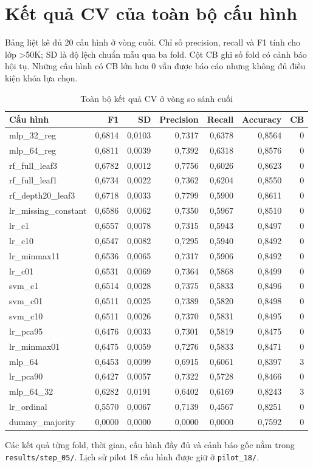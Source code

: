 \section{Kết quả CV của toàn bộ cấu hình}
\label{sec:C_1}
Bảng liệt kê đủ 20 cấu hình ở vòng cuối. Chỉ số precision, recall và F1 tính cho lớp >50K; SD là độ lệch chuẩn mẫu qua ba fold. Cột CB ghi số fold có cảnh báo hội tụ. Những cấu hình có CB lớn hơn 0 vẫn được báo cáo nhưng không đủ điều kiện khóa lựa chọn.
\begin{longtable}{lrrrrrr}
\caption{Toàn bộ kết quả CV ở vòng so sánh cuối}\label{tab:cv-all}\\
\toprule
Cấu hình & F1 & SD & Precision & Recall & Accuracy & CB \\
\midrule
mlp\_32\_reg & 0,6814 & 0,0103 & 0,7317 & 0,6378 & 0,8564 & 0 \\
mlp\_64\_reg & 0,6811 & 0,0039 & 0,7392 & 0,6318 & 0,8576 & 0 \\
rf\_full\_leaf3 & 0,6782 & 0,0012 & 0,7756 & 0,6026 & 0,8623 & 0 \\
rf\_full\_leaf1 & 0,6734 & 0,0022 & 0,7362 & 0,6204 & 0,8550 & 0 \\
rf\_depth20\_leaf3 & 0,6718 & 0,0033 & 0,7799 & 0,5900 & 0,8611 & 0 \\
lr\_missing\_constant & 0,6586 & 0,0062 & 0,7350 & 0,5967 & 0,8510 & 0 \\
lr\_c1 & 0,6557 & 0,0078 & 0,7315 & 0,5943 & 0,8497 & 0 \\
lr\_c10 & 0,6547 & 0,0082 & 0,7295 & 0,5940 & 0,8492 & 0 \\
lr\_minmax11 & 0,6536 & 0,0065 & 0,7317 & 0,5906 & 0,8492 & 0 \\
lr\_c01 & 0,6531 & 0,0069 & 0,7364 & 0,5868 & 0,8499 & 0 \\
svm\_c1 & 0,6514 & 0,0028 & 0,7375 & 0,5833 & 0,8496 & 0 \\
svm\_c01 & 0,6511 & 0,0025 & 0,7389 & 0,5820 & 0,8498 & 0 \\
svm\_c10 & 0,6511 & 0,0026 & 0,7370 & 0,5831 & 0,8495 & 0 \\
lr\_pca95 & 0,6476 & 0,0033 & 0,7301 & 0,5819 & 0,8475 & 0 \\
lr\_minmax01 & 0,6475 & 0,0059 & 0,7276 & 0,5833 & 0,8471 & 0 \\
mlp\_64 & 0,6453 & 0,0099 & 0,6915 & 0,6061 & 0,8397 & 3 \\
lr\_pca90 & 0,6427 & 0,0057 & 0,7322 & 0,5728 & 0,8466 & 0 \\
mlp\_64\_32 & 0,6282 & 0,0191 & 0,6402 & 0,6169 & 0,8243 & 3 \\
lr\_ordinal & 0,5570 & 0,0067 & 0,7139 & 0,4567 & 0,8251 & 0 \\
dummy\_majority & 0,0000 & 0,0000 & 0,0000 & 0,0000 & 0,7592 & 0 \\
\bottomrule
\end{longtable}
Các kết quả từng fold, thời gian, cấu hình đầy đủ và cảnh báo gốc nằm trong \texttt{results/step\_05/}. Lịch sử pilot 18 cấu hình được giữ ở \texttt{pilot\_18/}.
